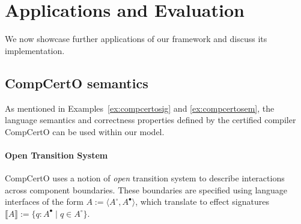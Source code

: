 \documentclass[acmsmall,screen,review,anonymous,nonacm]{acmart}
\newcommand{\que}{\circ}
\newcommand{\ans}{\bullet}
\begin{document}



\section{Applications and Evaluation} \label{sec:app} %

We now showcase further applications of our framework
and discuss its implementation.

\subsection{CompCertO semantics}\label{sec:application:compcerto} %


As mentioned in Examples~\ref{ex:compcertosig} and \ref{ex:compcertosem},
the language semantics and correctness properties
defined by the certified compiler CompCertO
can be used within our model.

\paragraph{Open Transition System}
CompCertO
uses a notion of \emph{open} transition system
to describe interactions across component boundaries.
These boundaries are specified using
language interfaces of the form
$A := \langle A^\que, A^\ans \rangle$,
which translate to effect signatures
$\llbracket A \rrbracket := \{ q : A^\ans \mid q \in A^\que \}$.
\end{document}
